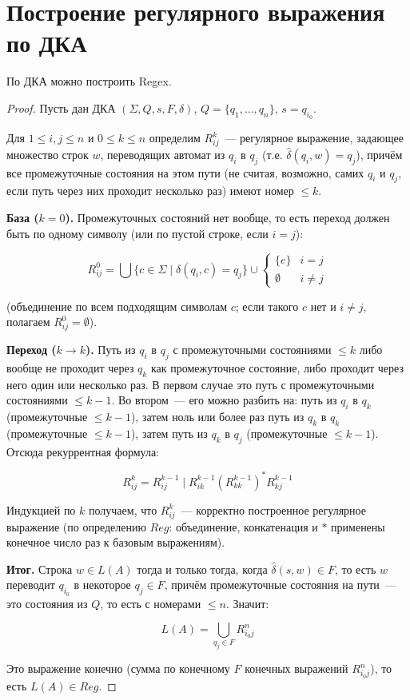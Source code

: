 \documentclass[12pt]{article}
\begin{document}
	\section{Построение регулярного выражения по ДКА}
	
	\begin{statement}
		По ДКА можно построить Regex.
	\end{statement}
	
	\begin{proof}
		Пусть дан ДКА $(\Sigma, Q, s, F, \delta)$, $Q = \{ q_1, \ldots, q_n \}$, $s = q_{i_0}$.
		
		Для $1 \leqslant i, j \leqslant n$ и $0 \leqslant k \leqslant n$ определим $R^k_{ij}$~--- регулярное выражение, задающее множество строк $w$, переводящих автомат из $q_i$ в $q_j$ (т.е. $\hat\delta(q_i, w) = q_j$), причём все промежуточные состояния на этом пути (не считая, возможно, самих $q_i$ и $q_j$, если путь через них проходит несколько раз) имеют номер $\leqslant k$.
		
		\textbf{База ($k = 0$).} Промежуточных состояний нет вообще, то есть переход должен быть по одному символу (или по пустой строке, если $i = j$):
		
		$$R^0_{ij} = \bigcup \{ c \in \Sigma \mid \delta(q_i, c) = q_j \} \cup \begin{cases} \{ e \} & i = j \\ \emptyset & i \neq j \end{cases}$$
		
		(объединение по всем подходящим символам $c$; если такого $c$ нет и $i \neq j$, полагаем $R^0_{ij} = \emptyset$).
		
		\textbf{Переход ($k \to k$).} Путь из $q_i$ в $q_j$ с промежуточными состояниями $\leqslant k$ либо вообще не проходит через $q_k$ как промежуточное состояние, либо проходит через него один или несколько раз. В первом случае это путь с промежуточными состояниями $\leqslant k - 1$. Во втором~--- его можно разбить на: путь из $q_i$ в $q_k$ (промежуточные $\leqslant k-1$), затем ноль или более раз путь из $q_k$ в $q_k$ (промежуточные $\leqslant k-1$), затем путь из $q_k$ в $q_j$ (промежуточные $\leqslant k-1$). Отсюда рекуррентная формула:
		
		$$R^k_{ij} = R^{k-1}_{ij} \mid R^{k-1}_{ik} \left( R^{k-1}_{kk} \right)^* R^{k-1}_{kj}$$
		
		Индукцией по $k$ получаем, что $R^k_{ij}$~--- корректно построенное регулярное выражение (по определению $Reg$: объединение, конкатенация и $*$ применены конечное число раз к базовым выражениям).
		
		\textbf{Итог.} Строка $w \in L(A)$ тогда и только тогда, когда $\hat\delta(s, w) \in F$, то есть $w$ переводит $q_{i_0}$ в некоторое $q_j \in F$, причём промежуточные состояния на пути~--- это состояния из $Q$, то есть с номерами $\leqslant n$. Значит:
		
		$$L(A) = \bigcup_{q_j \in F} R^n_{i_0 j}$$
		
		Это выражение конечно (сумма по конечному $F$ конечных выражений $R^n_{i_0 j}$), то есть $L(A) \in Reg$.
	\end{proof}
	
\end{document}
